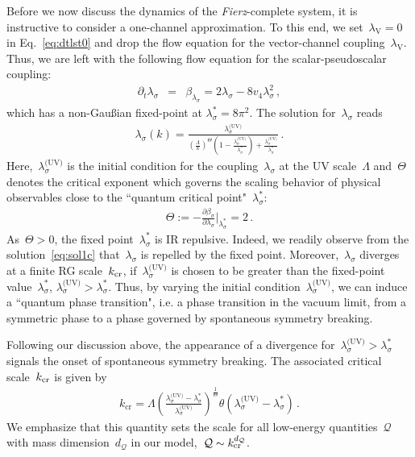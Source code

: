 \documentclass[prd,english,preprintnumbers,amsmath,amssymb,nofootinbib,twocolumn,superscriptaddress]{revtex4-1}
\newcommand{\be}{\begin{eqnarray}}
\newcommand{\ee}{\end{eqnarray}}
\newcommand{\del}{\partial}
\begin{document}
{Before we now discuss the dynamics of the {\it Fierz}-complete system, it is instructive to consider a one-channel approximation. To this end, we 
set~$\lambda_{\text{V}}=0$ in Eq.~\eqref{eq:dtlst0} and drop the flow equation for the vector-channel coupling~$\lambda_{\text{V}}$. Thus,
we are left with the following flow equation for the scalar-pseudoscalar coupling:
%
\be
\del_t \lambda_\sigma &=& \beta_{\lambda_\sigma} = 2 \lambda_\sigma - 8 v_4 \lambda_\sigma^2\,,
\label{eq:lsca}
\ee
%
which has a non-Gau\ss ian fixed-point at $\lambda_\sigma^\ast = 8\pi^2$. The solution for~$\lambda_{\sigma}$ reads
%
\be
\lambda_{\sigma}(k)=\frac{\lambda_{\sigma}^{\text{(UV)}}}{ \left(\frac{\Lambda}{k}\right)^{\Theta}\left(1- \frac{\lambda^{\text{(UV)}}_{\sigma}}{\lambda^{\ast}_{\sigma}}\right) + \frac{\lambda^{\text{(UV)}}_{\sigma}}{\lambda^{\ast}_{\sigma}}}\,.
\label{eq:sol1c}
\ee
%
Here,~$\lambda^{\text{(UV)}}_{\sigma}$ is the initial condition for the coupling~$\lambda_{\sigma}$ at the UV scale~$\Lambda$
and~$\Theta$ denotes the critical exponent which governs the scaling behavior of physical observables 
close to the ``quantum critical point"~$\lambda_{\sigma}^{\ast}$:
%
\be
\Theta:=-\frac{\partial \beta_{\sigma}}{\partial \lambda_{\sigma}}\bigg|_{\lambda_{\sigma}^{\ast}}=2\,.
\ee
%
As~$\Theta >0$, the fixed point~$\lambda_{\sigma}^{\ast}$ is IR repulsive. Indeed,
we readily observe from the solution~\eqref{eq:sol1c} that~$\lambda_{\sigma}$ is repelled by the fixed point. Moreover,~$\lambda_{\sigma}$ 
diverges at a finite RG scale~$k_{\rm cr}$, if~$\lambda^{\text{(UV)}}_{\sigma}$ is chosen to be greater
than the fixed-point value~$\lambda^{\ast}_{\sigma}$, $\lambda^{\text{(UV)}}_{\sigma} > \lambda^{\ast}_{\sigma}$. 
Thus, by varying the {initial condition~$\lambda_{\sigma}^{\text{(UV)}}$,
we can} induce a ``quantum phase transition", i.e. a phase transition in the vacuum limit, from a symmetric phase to 
a phase governed by spontaneous symmetry breaking.

Following our discussion above,
the appearance of a divergence for~$\lambda^{\text{(UV)}}_{\sigma} > \lambda^{\ast}_{\sigma}$
signals the onset of spontaneous symmetry breaking. The associated critical scale~$k_{\rm cr}$ is
given by
%
\be
k_\text{cr} = \Lambda\left( \frac{ \lambda^{\text{(UV)}}_{\sigma} - \lambda^{\ast}_{\sigma}}{\lambda^{\text{(UV)}}_{\sigma}} \right)^{\frac{1}{\Theta}}
\theta(\lambda^{\text{(UV)}}_{\sigma} - \lambda^{\ast}_{\sigma})
\,.
\label{eq:plaw}
\ee
%
We emphasize that 
this quantity sets the scale for all low-energy quantities~${\mathcal Q}$ with mass dimension~$d_{{\mathcal Q}}$ 
in our model,~${\mathcal Q}\sim k_{\rm cr}^{d_{{\mathcal Q}}}$.  

}
\end{document}
